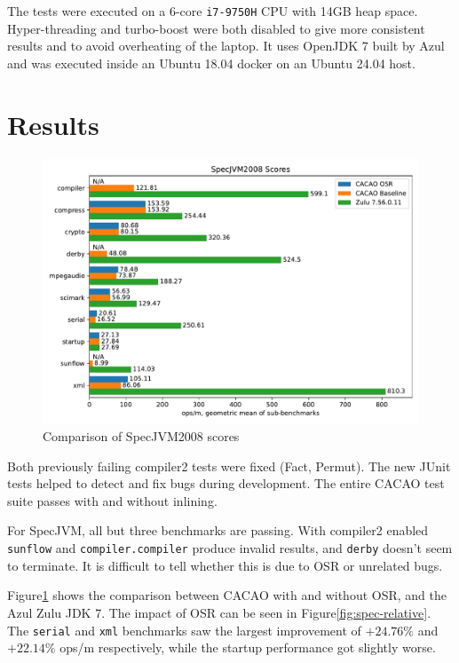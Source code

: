 \documentclass[draft,final]{vutinfth} %
\begin{document}
    The tests were executed on a 6-core \texttt{i7-9750H} CPU with 14GB heap space.
    Hyper-threading and turbo-boost were both disabled to give more consistent results and to avoid overheating of the laptop.
    It uses OpenJDK 7 built by Azul and was executed inside an Ubuntu 18.04 docker on an Ubuntu 24.04 host.


    \section{Results}

    \begin{figure}
        \centering
        \includegraphics[width=\textwidth]{../evaluation/specjvm/plots/plot3_grouped}
        \caption{Comparison of SpecJVM2008 scores}
        \label{fig:spec-cmp}
    \end{figure}


    Both previously failing compiler2 tests were fixed (Fact, Permut).
    The new JUnit tests helped to detect and fix bugs during development.
    The entire CACAO test suite passes with and without inlining.

    For SpecJVM, all but three benchmarks are passing.
    With compiler2 enabled \lstinline{sunflow} and \lstinline{compiler.compiler} produce invalid results, and \lstinline{derby} doesn't seem to terminate.
    It is difficult to tell whether this is due to OSR or unrelated bugs.

    Figure\ref{fig:spec-cmp} shows the comparison between CACAO with and without OSR,
    and the Azul Zulu JDK 7.
    The impact of OSR can be seen in Figure\ref{fig:spec-relative}.
    The \lstinline{serial} and \lstinline{xml} benchmarks saw the largest improvement of $+24.76\%$ and $+22.14\%$ ops/m respectively,
    while the startup performance got slightly worse.
\end{document}
